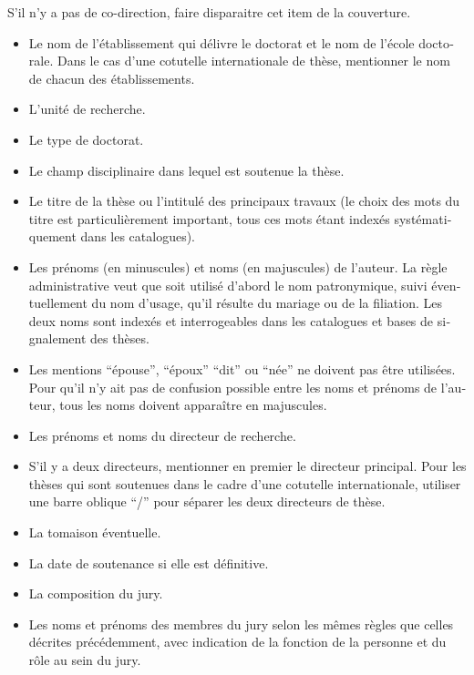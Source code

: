 \begin{otherlanguage}{french}
S’il n’y a pas de co-direction, faire disparaitre cet item de la couverture.


\begin{itemize}
	\item Le nom de l'établissement qui délivre le doctorat et le nom de l’école doctorale.
	Dans le cas d’une cotutelle internationale de thèse, mentionner le nom de chacun des
	établissements.
	\item  L'unité de recherche.
	\item Le type de doctorat.
	\item Le champ disciplinaire dans lequel est soutenue la thèse.
	\item Le titre de la thèse ou l’intitulé des principaux travaux (le choix des mots du titre est	particulièrement important, tous ces mots étant indexés systématiquement dans les catalogues).
	\item Les prénoms (en minuscules) et noms (en majuscules) de l'auteur.
	La règle administrative veut que soit utilisé d'abord le nom patronymique, suivi éventuellement du 	nom d’usage, qu’il résulte du mariage ou de la filiation. Les deux noms sont indexés et interrogeables dans les catalogues et bases de signalement des thèses.
	\item Les mentions \enquote{épouse}, \enquote{époux} \enquote{dit}  ou \enquote{née} ne doivent pas être utilisées. Pour qu'il n'y 	ait pas de confusion possible entre les noms et prénoms de l'auteur, tous les noms doivent apparaître en majuscules.
	\item Les prénoms et noms du directeur de recherche.
	\item S'il y a deux directeurs, mentionner en premier le directeur principal. 
        Pour les thèses qui sont soutenues dans le cadre d'une cotutelle internationale, utiliser une barre oblique \enquote{/} pour séparer les deux directeurs de thèse.
	\item La tomaison éventuelle.
	\item La date de soutenance si elle est définitive.
	\item La composition du jury.
	\item Les noms et prénoms des membres du jury selon les mêmes règles que celles décrites précédemment, avec indication de la fonction de la personne et du rôle au sein du jury. 
\end{itemize}


\end{otherlanguage}
